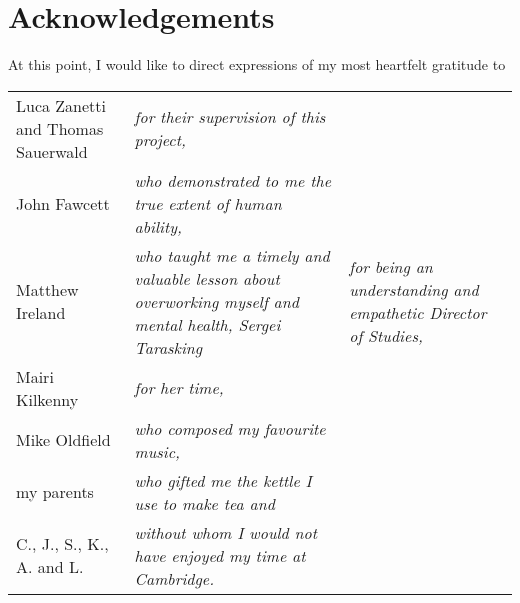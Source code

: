 \section*{Acknowledgements}

At this point, I would like to direct expressions of my most heartfelt gratitude to


\begin{tabular}{R{0.35\textwidth}L{0.6\textwidth}}
Luca Zanetti and Thomas Sauerwald	&\itshape	for their supervision of this project,\\
John Fawcett				&\itshape	who demonstrated to me the true extent of human ability,\\
Matthew Ireland				&\itshape 	who taught me a timely and valuable lesson about overworking myself and mental health,
Sergei Tarasking			&\itshape	for being an understanding and empathetic Director of Studies,\\
Mairi Kilkenny				&\itshape	for her time,\\
Mike Oldfield				&\itshape	who composed my favourite music,\\
my parents				&\itshape	who gifted me the kettle I use to make tea and\\
C., J., S., K., A. and L.		&\itshape	without whom I would not have enjoyed my time at Cambridge.
\end{tabular}
